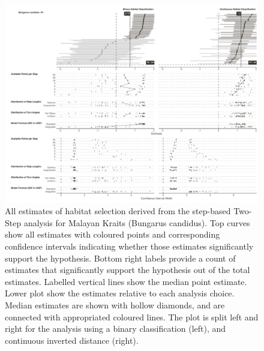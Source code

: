 \documentclass[10pt,a4paper]{article}
\begin{document}
\begin{figure}
\includegraphics[width=1\linewidth]{../../figures/specCurve_Bungarus candidus_twoStep} \caption{All estimates of habitat selection derived from the step-based Two-Step analysis for Malayan Kraits (Bungarus candidus). Top curves show all estimates with coloured points and corresponding confidence intervals indicating whether those estimates significantly support the hypothesis. Bottom right labels provide a count of estimates that significantly support the hypothesis out of the total estimates. Labelled vertical lines show the median point estimate. Lower plot show the estimates relative to each analysis choice. Median estimates are shown with hollow diamonds, and are connected with appropriated coloured lines. The plot is split left and right for the analysis using a binary classification (left), and continuous inverted distance (right).}\label{fig:specCurveTwoStepBUCA}
\end{figure}
\end{document}
